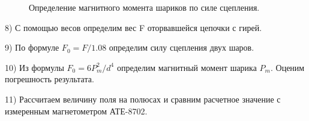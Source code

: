 \documentclass[a4paper,12pt]{article} %
\begin{document}
\begin{figure}[H]
\noindent{}
\caption{Определение магнитного момента шариков по силе сцепления.}
\label{pic2:ref}
\end{figure}

8) С помощью весов определим вес F оторвавшейся цепочки с гирей.

9) По формуле $F_0 = F/1.08$ определим силу сцепления двух шаров.

10) Из формулы $F_0 = 6P_m^2 /d^4$ определим магнитный момент шарика $P_m$. Оценим погрешность результата.

11) Рассчитаем величину поля на полюсах и сравним расчетное значение с измеренным магнетометром АТЕ-8702.
\end{document}
